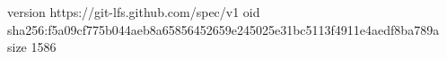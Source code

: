 version https://git-lfs.github.com/spec/v1
oid sha256:f5a09cf775b044aeb8a65856452659e245025e31bc5113f4911e4aedf8ba789a
size 1586
